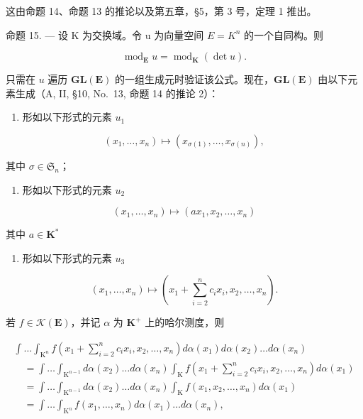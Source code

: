 这由命题 14、命题 13 的推论以及第五章，§5，第 3 号，定理 1 推出。

命题 15. --- 设 K 为交换域。令 u 为向量空间 \(E = K^{n}\) 的一个自同构。则

\[
\operatorname{mod} _ {\mathbf {E}} u = \operatorname{mod} _ {\mathbf {K}} (\det u).
\]

只需在 \(u\) 遍历 \(\mathbf{GL}(\mathbf{E})\) 的一组生成元时验证该公式。现在，\(\mathbf{GL}(\mathbf{E})\) 由以下元素生成（A, II, §10, No.~13, 命题 14 的推论 2）：

\begin{enumerate}
\def\labelenumi{(\alph{enumi})}
\tightlist
\item
  形如以下形式的元素 \(u_{1}\)
\end{enumerate}

\[
\left(x _ {1}, \dots , x _ {n}\right) \mapsto \left(x _ {\sigma (1)}, \dots , x _ {\sigma (n)}\right),
\]

其中 \(\sigma \in \mathfrak{S}_n\)；

\begin{enumerate}
\def\labelenumi{(\alph{enumi})}
\setcounter{enumi}{1}
\tightlist
\item
  形如以下形式的元素 \(u_{2}\)
\end{enumerate}

\[
\left(x _ {1}, \dots , x _ {n}\right) \mapsto \left(a x _ {1}, x _ {2}, \dots , x _ {n}\right)
\]

其中 \(a\in \mathbf{K}^*\)

\begin{enumerate}
\def\labelenumi{(\alph{enumi})}
\setcounter{enumi}{2}
\tightlist
\item
  形如以下形式的元素 \(u_{3}\)
\end{enumerate}

\[
\left(x _ {1}, \dots , x _ {n}\right) \mapsto \left(x _ {1} + \sum_ {i = 2} ^ {n} c _ {i} x _ {i}, x _ {2}, \dots , x _ {n}\right).
\]

若 \(f \in \mathcal{K}(\mathbf{E})\)，并记 \(\alpha\) 为 \(\mathbf{K}^+\) 上的哈尔测度，则

\[
\begin{array}{l} \int \dots \int_ {\mathrm{K} ^ {n}} f (x _ {1} + \sum_ {i = 2} ^ {n} c _ {i} x _ {i}, x _ {2}, \ldots , x _ {n}) d \alpha (x _ {1}) d \alpha (x _ {2}) \ldots d \alpha (x _ {n}) \\ \quad = \int \dots \int_ {\mathrm{K} ^ {n - 1}} d \alpha (x _ {2}) \ldots d \alpha (x _ {n}) \int_ {\mathrm{K}} f (x _ {1} + \sum_ {i = 2} ^ {n} c _ {i} x _ {i}, x _ {2}, \ldots , x _ {n}) d \alpha (x _ {1}) \\ \quad = \int \dots \int_ {\mathrm{K} ^ {n - 1}} d \alpha (x _ {2}) \ldots d \alpha (x _ {n}) \int_ {\mathrm{K}} f (x _ {1}, x _ {2}, \ldots , x _ {n}) d \alpha (x _ {1}) \\ \quad = \int \dots \int_ {\mathrm{K} ^ {n}} f (x _ {1}, \ldots , x _ {n}) d \alpha (x _ {1}) \ldots d \alpha (x _ {n}), \end{array}
\]

